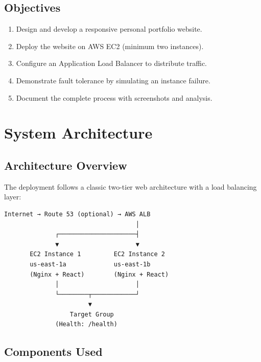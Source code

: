 \documentclass[12pt,a4paper]{article}
\begin{document}
\subsection{Objectives}
\begin{enumerate}[label=\arabic*.]
  \item Design and develop a responsive personal portfolio website.
  \item Deploy the website on AWS EC2 (minimum two instances).
  \item Configure an Application Load Balancer to distribute traffic.
  \item Demonstrate fault tolerance by simulating an instance failure.
  \item Document the complete process with screenshots and analysis.
\end{enumerate}

\section{System Architecture}

\subsection{Architecture Overview}

The deployment follows a classic two-tier web architecture with a load balancing layer:

\begin{verbatim}
Internet → Route 53 (optional) → AWS ALB
                                    │
              ┌─────────────────────┤
              ▼                     ▼
       EC2 Instance 1         EC2 Instance 2
       us-east-1a             us-east-1b
       (Nginx + React)        (Nginx + React)
              │                     │
              └────────┬────────────┘
                       ▼
                  Target Group
              (Health: /health)
\end{verbatim}

\subsection{Components Used}
\end{document}
